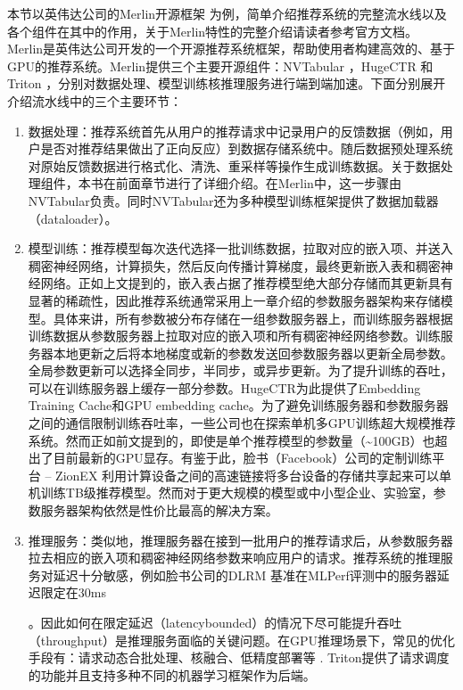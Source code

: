 \documentclass[letterpaper,10pt,english]{sphinxmanual}
\begin{document}
\sphinxAtStartPar
本节以英伟达公司的Merlin开源框架
为例，简单介绍推荐系统的完整流水线以及各个组件在其中的作用，关于Merlin特性的完整介绍请读者参考官方文档。
Merlin是英伟达公司开发的一个开源推荐系统框架，帮助使用者构建高效的、基于GPU的推荐系统。Merlin提供三个主要开源组件：NVTabular
，HugeCTR 和Triton
，分别对数据处理、模型训练核推理服务进行端到端加速。下面分别展开介绍流水线中的三个主要环节：
\begin{enumerate}
%
\item {} 
\sphinxAtStartPar
数据处理：推荐系统首先从用户的推荐请求中记录用户的反馈数据（例如，用户是否对推荐结果做出了正向反应）到数据存储系统中。随后数据预处理系统对原始反馈数据进行格式化、清洗、重采样等操作生成训练数据。关于数据处理组件，本书在前面章节进行了详细介绍。在Merlin中，这一步骤由NVTabular负责。同时NVTabular还为多种模型训练框架提供了数据加载器（dataloader）。

\item {} 
\sphinxAtStartPar
模型训练：推荐模型每次迭代选择一批训练数据，拉取对应的嵌入项、并送入稠密神经网络，计算损失，然后反向传播计算梯度，最终更新嵌入表和稠密神经网络。正如上文提到的，嵌入表占据了推荐模型绝大部分存储而其更新具有显著的稀疏性，因此推荐系统通常采用上一章介绍的参数服务器架构来存储模型。具体来讲，所有参数被分布存储在一组参数服务器上，而训练服务器根据训练数据从参数服务器上拉取对应的嵌入项和所有稠密神经网络参数。训练服务器本地更新之后将本地梯度或新的参数发送回参数服务器以更新全局参数。全局参数更新可以选择全同步，半同步，或异步更新。为了提升训练的吞吐，可以在训练服务器上缓存一部分参数。HugeCTR为此提供了Embedding
Training Cache和GPU embedding
cache。为了避免训练服务器和参数服务器之间的通信限制训练吞吐率，一些公司也在探索单机多GPU训练超大规模推荐系统。然而正如前文提到的，即使是单个推荐模型的参数量（\textasciitilde{}100GB）也超出了目前最新的GPU显存。有鉴于此，脸书（Facebook）公司的定制训练平台
– ZionEX
利用计算设备之间的高速链接将多台设备的存储共享起来可以单机训练TB级推荐模型。然而对于更大规模的模型或中小型企业、实验室，参数服务器架构依然是性价比最高的解决方案。

\item {} 
\sphinxAtStartPar
推理服务：类似地，推理服务器在接到一批用户的推荐请求后，从参数服务器拉去相应的嵌入项和稠密神经网络参数来响应用户的请求。推荐系统的推理服务对延迟十分敏感，例如脸书公司的DLRM
基准在MLPerf评测中的服务器延迟限定在30ms \sphinxstepexplicit %
\begin{footnote}[1]\label{\thesphinxscope.1}%
\sphinxAtStartFootnote
{}
%
\end{footnote}。因此如何在限定延迟（latency\sphinxhyphen{}bounded）的情况下尽可能提升吞吐（throughput）是推理服务面临的关键问题。在GPU推理场景下，常见的优化手段有：请求动态合批处理、核融合、低精度部署等
.
Triton提供了请求调度的功能并且支持多种不同的机器学习框架作为后端。


\end{enumerate}
\end{document}
